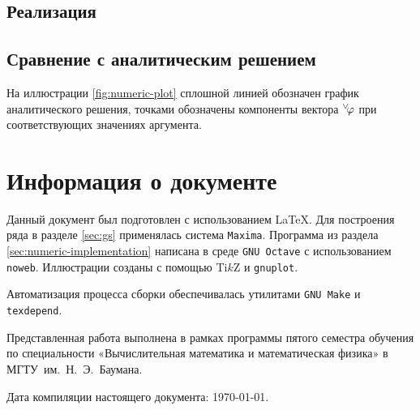 \documentclass{article}
\numberwithin{equation}{section}
\renewcommand{\phi}{\varphi}
\renewcommand{\vec}[1]{{}^{\vee}\negmedspace#1}
\providecommand{\program}[1]{{\tt #1}}
\begin{document}
\subsection{Реализация}
\label{sec:numerical-implementation}



\subsection{Сравнение с аналитическим решением}
\label{sec:comparison}

На иллюстрации \ref{fig:numeric-plot} сплошной линией обозначен график
аналитического решения, точками обозначены компоненты вектора
$\vec{\phi}$ при соответствующих значениях аргумента.



\clearpage
\appendix
\section{Информация о документе}

Данный документ был подготовлен с использованием \LaTeX{}. Для
построения ряда в разделе \ref{sec:gs} применялась система
\program{Maxima}. Программа из раздела
\ref{sec:numeric-implementation} написана в среде \program{GNU Octave}
с использованием \program{noweb}. Иллюстрации созданы с помощью Ti$k$Z
и \program{gnuplot}.

Автоматизация процесса сборки обеспечивалась утилитами
\program{GNU Make} и \program{texdepend}.

Представленная работа выполнена в рамках программы пятого семестра
обучения по специальности «Вычислительная математика и математическая
физика» в МГТУ им. Н. Э. Баумана.

Дата компиляции настоящего документа: \today.



\end{document}
